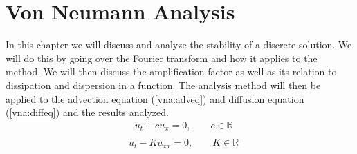 \chapter{Von Neumann Analysis}
In this chapter we will discuss and analyze the stability of a discrete solution. We will do this by going over the Fourier transform and how it applies to the method. We will then discuss the amplification factor as well as its relation to dissipation and dispersion in a function. The analysis method will then be applied to the advection equation (\ref{vna:adveq}) and diffusion equation (\ref{vna:diffeq}) and the results analyzed.
\begin{equation} \label{vna:adveq}
\begin{align}
  &u_t + cu_x = 0, \qquad c \in \mathbb{R} \\ 
\end{align}
\end{equation}
\begin{equation} \label{vna:diffeq}
\begin{align}
  &u_{t} - Ku_{xx} = 0, \qquad K \in \mathbb{R} \\ 
\end{align}
\end{equation}
